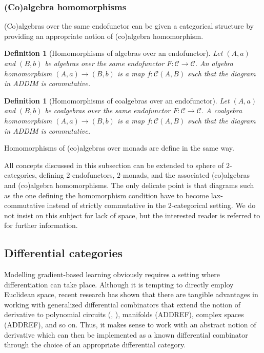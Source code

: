 \documentclass[12pt,a4paper,openright,twoside]{report}
\theoremstyle{plain}
\newtheorem{definition}[proposition]{Definition}
\theoremstyle{definition}
\begin{document}
\subsubsection{(Co)algebra homomorphisms}

(Co)algebras over the same endofunctor can be given a categorical structure by providing an appropriate notion of (co)algebra homomorphism.

\begin{definition}[Homomorphisms of algebras over an endofunctor]
  Let $(A,a)$ and $(B,b)$ be algebras over the same endofunctor $F: \mathcal{C} \to \mathcal{C}$. An algebra homomorphism $(A,a)\to (B,b)$ is a map $f: \mathcal{C}(A,B)$ such that the diagram in ADDIM is commutative.
\end{definition}

\begin{definition}[Homomorphisms of coalgebras over an endofunctor]
  Let $(A,a)$ and $(B,b)$ be coalgebras over the same endofunctor $F: \mathcal{C} \to \mathcal{C}$. A coalgebra homomorphism $(A,a) \to (B,b)$ is a map $f: \mathcal{C}(A,B)$ such that the diagram in ADDIM is commutative.
\end{definition}

Homomorphisms of (co)algebras over monads are define in the same way. 

All concepts discussed in this subsection can be extended to sphere of $2$-categories, defining $2$-endofunctors, $2$-monads, and the associated (co)algebras and (co)algebra homomorphisms. The only delicate point is that diagrams such as the one defining the homomorphism condition have to become lax-commutative instead of strictly commutative in the $2$-categorical setting. We do not insist on this subject for lack of space, but the interested reader is referred to \cite{gavranovicposition} for further information.



\subsection{Differential categories}
\label{subsec: diffcats}


Modelling gradient-based learning obviously requires a setting where differentiation can take place. Although it is tempting to directly employ Euclidean space, recent research has shown that there are tangible advantages in working with generalized differential combinators that extend the notion of derivative to polynomial circuits (\cite{wilson2022categories}, \cite{wilson2021reverse}), manifolds (ADDREF), complex spaces (ADDREF), and so on. 
Thus, it makes sense to work with an abstract notion of derivative which can then be implemented as a known differential combinator through the choice of an appropriate differential category.
\end{document}
